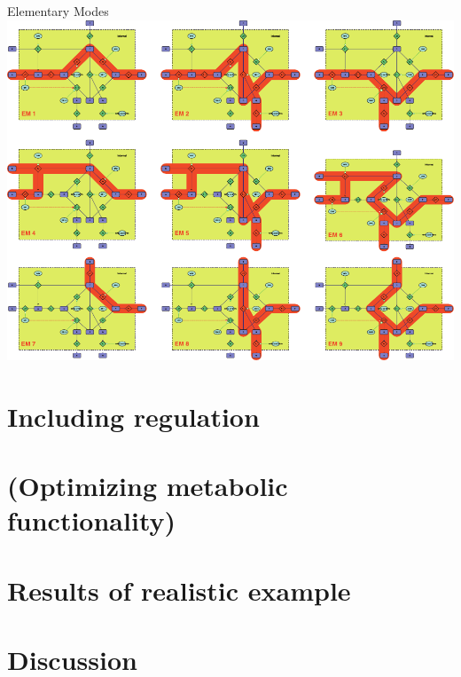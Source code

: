 \documentclass{beamer}
\begin{document}
\begin{frame}{Elementary Modes}
    \includegraphics[width=.9\textwidth]{grafik/fig2} \\
\end{frame}
\section{Including regulation}


\section{(Optimizing metabolic functionality)}


\section{Results of realistic example}


\section{Discussion}
\end{document}

